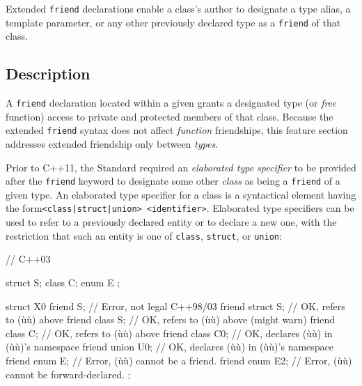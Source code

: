 
\setcounter{table}{0}
\setcounter{footnote}{0}
\setcounter{lstlisting}{0}


Extended \lstinline!friend! declarations enable a class's author to
designate a type alias, a template parameter, or any other previously
declared type as a \lstinline!friend! of that class.

\subsection[Description]{Description}\label{description-extendedfriend}

A \lstinline!friend! declaration located within a given
 grants a designated type (or
\emph{free} function) access to private and protected members of that
class. Because the extended \lstinline!friend! syntax does not affect
\emph{function} friendships, this feature section addresses extended
friendship only between \emph{types}.

Prior to C++11, the Standard required an \emph{elaborated type
specifier} to be provided after the \lstinline!friend! keyword to designate
some other \emph{class} as being a \lstinline!friend! of a given type. An
elaborated type specifier for a class is a syntactical element having the form\linebreak[4]
\mbox{\lstinline!<class|struct|union>!~\lstinline!<identifier>!}. Elaborated
type specifiers can be used to refer to a previously declared entity or
to declare a new one, with the restriction that such an entity is
one of \lstinline!class!, \lstinline!struct!, or \lstinline!union!:

\begin{emcppslisting}
// C++03

struct S;
class C;
enum E { };

struct X0
{
    friend S;         // Error, not legal C++98/03
    friend struct S;  // OK, refers to (ù{}ù) above
    friend class S;   // OK, refers to (ù{}ù) above (might warn)
    friend class C;   // OK, refers to (ù{}ù) above
    friend class C0;  // OK, declares (ù{}ù) in (ù{}ù)'s namespace
    friend union U0;  // OK, declares (ù{}ù) in (ù{}ù)'s namespace
    friend enum E;    // Error, (ù{}ù) cannot be a friend.
    friend enum E2;   // Error, (ù{}ù) cannot be forward-declared.
};
\end{emcppslisting}
    
